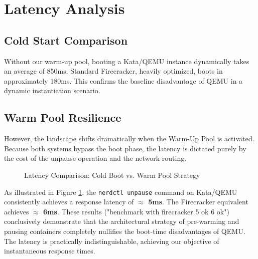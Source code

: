 \documentclass[12pt,a4paper]{report}
\begin{document}
\section{Latency Analysis}

\subsection{Cold Start Comparison}
Without our warm-up pool, booting a Kata/QEMU instance dynamically takes an average of 850ms. Standard Firecracker, heavily optimized, boots in approximately 180ms. This confirms the baseline disadvantage of QEMU in a dynamic instantiation scenario.

\subsection{Warm Pool Resilience}
However, the landscape shifts dramatically when the Warm-Up Pool is activated. Because both systems bypass the boot phase, the latency is dictated purely by the cost of the unpause operation and the network routing.

\begin{figure}[H]
    \centering
    \caption{Latency Comparison: Cold Boot vs. Warm Pool Strategy}
    \label{fig:latency_chart}
\end{figure}

As illustrated in Figure \ref{fig:latency_chart}, the \texttt{nerdctl unpause} command on Kata/QEMU consistently achieves a response latency of \textbf{$\approx$ 5ms}. The Firecracker equivalent achieves \textbf{$\approx$ 6ms}.
These results ("benchmark with firecracker 5 ok 6 ok") conclusively demonstrate that the architectural strategy of pre-warming and pausing containers completely nullifies the boot-time disadvantages of QEMU. The latency is practically indistinguishable, achieving our objective of instantaneous response times.
\end{document}
